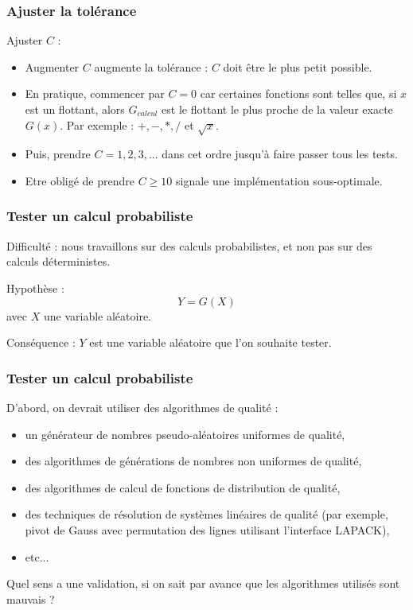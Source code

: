 \documentclass{beamer}
\begin{document}
\begin{frame}[containsverbatim]
\frametitle{Ajuster la tolérance}

Ajuster $C$ :
\begin{itemize}
\item Augmenter $C$ augmente la tolérance : $C$ doit être 
le plus petit possible. 

\item En pratique, commencer par $C=0$ car certaines fonctions 
sont telles que, si $x$ est un flottant, alors $G_{calcul}$ est le 
flottant le plus proche de la valeur exacte $G(x)$. Par exemple : 
$+,-,*,/$ et $\sqrt{x}$.

\item Puis, prendre $C=1,2,3,...$ dans cet ordre 
jusqu'à faire passer tous les tests.

\item Etre obligé de prendre $C\geq 10$ signale une implémentation sous-optimale.
\end{itemize}
\end{frame}

\begin{frame}[containsverbatim]
\frametitle{Tester un calcul probabiliste}

Difficulté : nous travaillons sur des calculs probabilistes, 
et non pas sur des calculs déterministes.

Hypothèse :
$$
Y=G(X)
$$
avec $X$ une variable aléatoire. 

Conséquence : $Y$ est une variable aléatoire que l'on souhaite tester.
\end{frame}

\begin{frame}[containsverbatim]
\frametitle{Tester un calcul probabiliste}

D'abord, on devrait utiliser des algorithmes de qualité :
\begin{itemize}
\item un générateur de nombres pseudo-aléatoires 
uniformes de qualité,
\item des algorithmes de générations de nombres non uniformes 
de qualité,
\item des algorithmes de calcul de fonctions de distribution 
de qualité,
\item des techniques de résolution de systèmes linéaires 
 de qualité (par exemple, pivot de Gauss avec permutation des lignes 
utilisant l'interface LAPACK),
\item etc...
\end{itemize}

Quel sens a une validation, si on sait par avance que les algorithmes 
utilisés sont mauvais ?

\end{frame}
\end{document}

